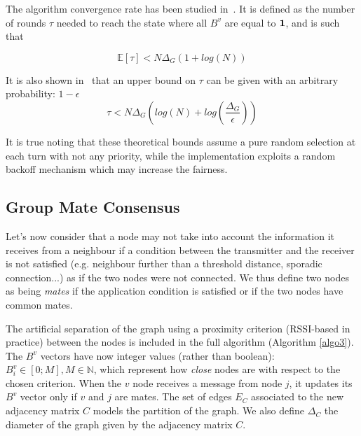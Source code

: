 \documentclass{sig-alternate}
\begin{document}
\newcommand{\setone}{\bold{1}}

The {\sgc} algorithm convergence rate has been studied in~\cite{mobihoc}. It is defined as the number of rounds $\tau$ needed to reach the state where all $B^v$ are equal to $\setone$, and is such that

\addtocounter{equation}{-1}
\begin{equation}
\label{theorem1}
\mathbb{E}[\tau] < N\Delta_G(1+log(N))
\end{equation}

It is also shown in~\cite{mobihoc} that an upper bound on $\tau$ can be given with an arbitrary probability: $1-\epsilon$
\begin{equation}
\label{theorem2}
\tau < N\Delta_G\left(log(N)+log\left(\frac{\Delta_G}{\epsilon}\right)\right)
\end{equation}

It is true noting that these theoretical bounds assume a pure random selection at each turn with not any priority, while the implementation exploits a random backoff mechanism which may increase the fairness. 




\newcommand{\rbm}{\sc RBM}
\newcommand{\rgg}{\sc RGG}







 

\subsection{Group Mate Consensus}
\label{sec-extension}
\label{sec:group_det}

\newcommand{\gmc}{\sc gmc}




Let's now consider that a node may not take into account the information it receives from a neighbour if a condition between the transmitter and the receiver is not satisfied (e.g. neighbour further than a threshold distance, sporadic connection...) as if the two nodes were not connected. We thus define two nodes as being \emph{mates} if the application condition is satisfied or if the two nodes have common mates.





The artificial separation of the graph using a proximity criterion (RSSI-based in practice) between the nodes is included in the full algorithm (Algorithm \ref{algo3}).
The $B^v$ vectors have now integer values (rather than boolean):  $B^v_i \in[0;M], M\in \mathbb{N}$, which represent how {\em close} nodes are with respect to the chosen criterion. When the $v$ node receives a message from node $j$, it updates its $B^v$ vector only if $v$ and $j$ are mates.
The set of edges $E_C$ associated to the new adjacency matrix $C$  models the partition of the graph. We also define $\Delta_C$ the diameter of the graph given by the adjacency matrix $C$.
\end{document}
